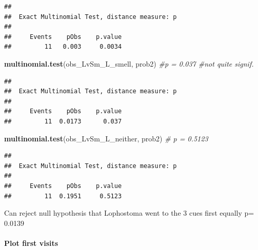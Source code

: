 \documentclass[]{article}
\newenvironment{Shaded}{\begin{snugshade}}{\end{snugshade}}
\newcommand{\KeywordTok}[1]{\textcolor[rgb]{0.13,0.29,0.53}{\textbf{{#1}}}}
\newcommand{\CommentTok}[1]{\textcolor[rgb]{0.56,0.35,0.01}{\textit{{#1}}}}
\newcommand{\NormalTok}[1]{{#1}}
\let\oldparagraph\paragraph
\renewcommand{\paragraph}[1]{\oldparagraph{#1}\mbox{}}
\begin{document}
\begin{verbatim}
## 
##  Exact Multinomial Test, distance measure: p
## 
##     Events    pObs    p.value
##         11   0.003     0.0034
\end{verbatim}

\begin{Shaded}
\begin{Highlighting}[]
 \KeywordTok{multinomial.test}\NormalTok{(obs_LvSm_L_smell, prob2) }\CommentTok{#p = 0.037 #not quite signif.}
\end{Highlighting}
\end{Shaded}

\begin{verbatim}
## 
##  Exact Multinomial Test, distance measure: p
## 
##     Events    pObs    p.value
##         11  0.0173      0.037
\end{verbatim}

\begin{Shaded}
\begin{Highlighting}[]
 \KeywordTok{multinomial.test}\NormalTok{(obs_LvSm_L_neither, prob2) }\CommentTok{# p = 0.5123}
\end{Highlighting}
\end{Shaded}

\begin{verbatim}
## 
##  Exact Multinomial Test, distance measure: p
## 
##     Events    pObs    p.value
##         11  0.1951     0.5123
\end{verbatim}

Can reject null hypothesis that Lophostoma went to the 3 cues first
equally p= 0.0139

\paragraph{Plot first visits}\label{plot-first-visits-1}
\end{document}
